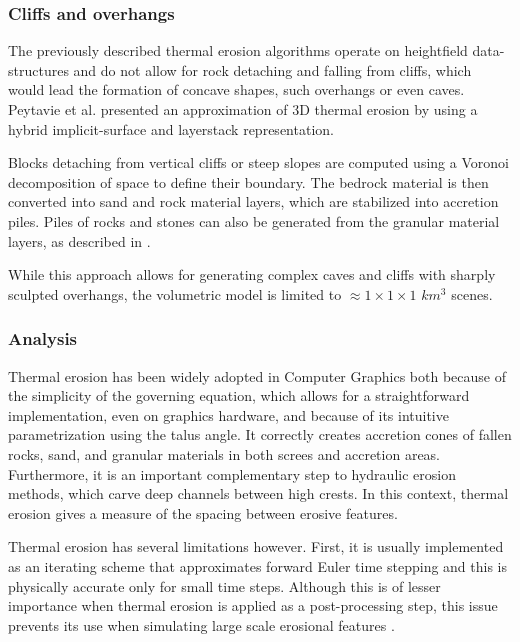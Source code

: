\documentclass{article}
\begin{document}
\subsubsection{Cliffs and overhangs}

The previously described thermal erosion algorithms operate on heightfield data-structures and do not allow for rock detaching and falling from cliffs, which would lead the formation of concave shapes, such overhangs or even caves. Peytavie et al. \cite{PGMG09a} presented an approximation of 3D thermal erosion by using a hybrid implicit-surface and layerstack representation.

Blocks detaching from vertical cliffs or steep slopes are computed using a Voronoi decomposition of space to define their boundary. The bedrock material is then converted into sand and rock material layers, which are stabilized into accretion piles. Piles of rocks and stones can also be generated from the granular material layers, as described in \cite{PGMG09b}.

While this approach allows for generating complex caves and cliffs with sharply sculpted overhangs, the volumetric model is limited to $\approx 1 \times 1 \times 1$ $km^3$ scenes.

\subsubsection{Analysis}

Thermal erosion has been widely adopted in Computer Graphics both because of the simplicity of the governing equation, which allows for a straightforward implementation, even on graphics hardware, and because of its intuitive parametrization using the talus angle. It correctly creates accretion cones of fallen rocks, sand, and granular materials in both screes and accretion areas. Furthermore, it is an important complementary step to hydraulic erosion methods, which carve deep channels between high crests. In this context, thermal erosion gives a measure of the spacing between erosive features.

Thermal erosion has several limitations however. First, it is usually implemented as an iterating scheme that approximates forward Euler time stepping and this is physically accurate only for small time steps. Although this is of lesser importance when thermal erosion is applied as a post-processing step, this issue prevents its use when simulating large scale erosional features \cite{CBC16}.
\end{document}
